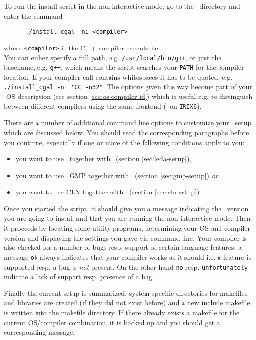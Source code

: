 To run the install script in the non-interactive mode, go to the
\cgaldir\ directory and enter the command
\begin{verbatim}
      ./install_cgal -ni <compiler>
\end{verbatim}
where \texttt{<compiler>} is the C++ compiler
executable.\\ You can either specify a full
path, e.g. \texttt{/usr/local/bin/g++}, or just the basename, e.g.
\texttt{g++}, which means the script searches your \texttt{PATH} for
the compiler location. If your compiler call contains whitespaces it
has to be quoted, e.g.  \texttt{./install\_cgal -ni "CC -n32"}.  The
options given this way become part of your \cgal-OS
description (see section
\ref{sec:os-compiler-id}) which is useful e.g. to distinguish between
different compilers using the same frontend (\mipsprocc\ on
\texttt{IRIX6}).

There are a number of additional command line options to customize
your \cgal\ setup which are discussed below. You should read the
corresponding paragraphs before you continue, especially if one or
more of the following conditions apply to you:
\begin{itemize}
\item you want to use \leda\ together with \cgal\ (section
  \ref{sec:leda-setup}),
\item you want to use \gnu\ GMP together with \cgal\ (section
  \ref{sec:gmp-setup}) \textit{or}
\item you want to use CLN together with \cgal\ (section
  \ref{sec:cln-setup}).
\end{itemize}

Once you started the script, it should give you a message indicating
the \cgal\ version you are going to install and that you are running
the non-interactive mode. Then it proceeds by locating some utility
programs, determining your OS and compiler version and displaying the
settings you gave via command line. Your compiler is also checked for
a number of bugs resp. support of certain language features; a message
\texttt{ok} always indicates that your compiler works as it should
i.e. a feature is supported resp. a bug is \textit{not} present. On
the other hand \texttt{no} resp.  \texttt{unfortunately} indicate a
lack of support resp. presence of a bug.

Finally the current setup is summarized, system specific directories
for makefiles and libraries are created (if they did not exist before)
and a new include makefile is written into the makefile directory. If
there already exists a makefile for the current OS/compiler
combination, it is backed up and you should get a corresponding
message.

